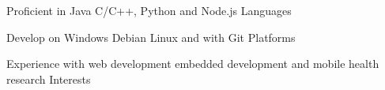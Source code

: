 \begin{cvhonors}

    \cvhonor
      {Proficient in Java}
      {C/C++, Python and Node.js}
      {}
      {Languages}
      
        \cvhonor
      {Develop on Windows}
      {Debian Linux and with Git}
      {}
      {Platforms  }
      
    \cvhonor
      {Experience with web development}
      {embedded development and mobile health research}
      {}
      {Interests      }


\end{cvhonors}

